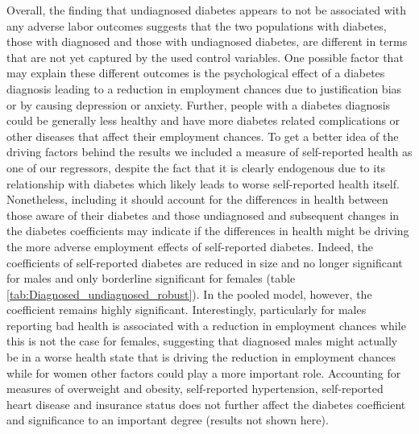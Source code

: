 \documentclass[12pt,english,british]{article}
\begin{document}
Overall, the finding that undiagnosed diabetes appears to not be associated with any adverse labor outcomes suggests that the two populations with diabetes, those with diagnosed and those with undiagnosed diabetes, are different in terms that are not yet captured by the used control variables. One possible factor that may explain these different outcomes is the psychological effect of a diabetes diagnosis leading to a reduction in employment chances due to justification bias or by causing depression or anxiety. Further, people with a diabetes diagnosis could be generally less healthy and have more diabetes related complications or other diseases that affect their employment chances. To get a better idea of the driving factors behind the results we included a measure of self-reported health as one of our regressors, despite the fact that it is clearly endogenous due to its relationship with diabetes which likely leads to worse self-reported health itself. Nonetheless, including it should account for the differences in health between those aware of their diabetes and those undiagnosed and subsequent changes in the diabetes coefficients may indicate if the differences in health might be driving the more adverse employment effects of self-reported diabetes. Indeed, the coefficients of self-reported diabetes are reduced in size and no longer significant for males and only borderline significant for females (table \ref{tab:Diagnosed_undiagnosed_robust}). In the pooled model, however, the coefficient remains highly significant. Interestingly, particularly for males reporting bad health is associated with a reduction in employment chances while this is not the case for females, suggesting that diagnosed males might actually be in a worse health state that is driving the reduction in employment chances while for women other factors could play a more important role. Accounting for measures of overweight and obesity, self-reported hypertension, self-reported heart disease and insurance status does not further affect the diabetes coefficient and significance to an important degree (results not shown here).
\end{document}
